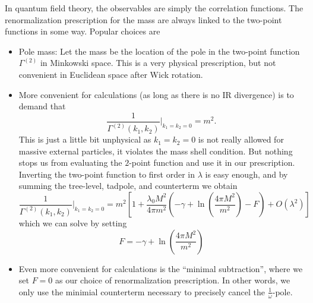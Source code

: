 In quantum field theory, the observables are simply the correlation
functions. The renormalization prescription for the mass are always
linked to the two-point functions in some way. Popular choices are
\begin{itemize}
\item Pole mass: Let the mass be the location of the pole in the
  two-point function $\Gamma^{(2)}$ in Minkowski space. This is a very
  physical prescription, but not convenient in Euclidean space after
  Wick rotation.
\item More convenient for calculations (as long as there is no IR
  divergence) is to demand that
  \begin{equation}
    \frac{1}{\Gamma^{(2)}(k_1,k_2)} \Big|_{k_1=k_2=0} = m^2.
  \end{equation}
  This is just a little bit unphysical as $k_1=k_2=0$ is not really
  allowed for massive external particles, it violates the mass shell
  condition. But nothing stops us from evaluating the $2$-point
  function and use it in our prescription. Inverting the two-point
  function to first order in $\lambda$ is easy enough, and by summing
  the tree-level, tadpole, and counterterm we obtain
  \begin{equation}
    \frac{1}{\Gamma^{(2)}(k_1,k_2)} \Big|_{k_1=k_2=0} =
    m^2 \left[
      1 + 
      \frac{\lambda_0 M^2}{4\pi m^2} \left(
        -\gamma + 
        \ln\left(\frac{4\pi M^2}{m^2}\right) - F
      \right)
      + O(\lambda^2)
    \right]
  \end{equation}
  which we can solve by setting
  \begin{equation}
    F = -\gamma + \ln\left(\frac{4\pi M^2}{m^2}\right)
  \end{equation}
\item Even more convenient for calculations is the ``minimal
  subtraction'', where we set $F=0$ as our choice of renormalization
  prescription. In other words, we only use the minimial counterterm
  necessary to precisely cancel the $\frac{1}{\omega}$-pole.
\end{itemize}


